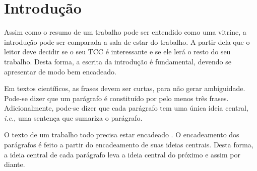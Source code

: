 \documentclass[12pt]{tcc}
\begin{document}

\dcover

\dcoverback
	
		




\dtables
	

\justifying
	
\chapter{Introdução}
\label{sec:introducao}

Assim como o resumo de um trabalho pode ser entendido como uma vitrine, a introdução pode ser comparada a sala de estar do trabalho. A partir dela que o leitor deve decidir se o seu \acrfull{TCC} é interessante e se ele lerá o resto do seu trabalho. Desta forma, a escrita da introdução é fundamental, devendo se apresentar de modo bem encadeado. 

Em textos científicos, as frases devem ser curtas, para não gerar ambiguidade. Pode-se dizer que um parágrafo é constituído por pelo menos três frases. Adicionalmente, pode-se dizer que cada parágrafo tem uma única ideia central, \emph{i.e.}, uma sentença  que sumariza o parágrafo. 

O texto de um trabalho todo precisa estar encadeado \citep{zobel_writing_2015}. O encadeamento dos parágrafos é feito a partir do encadeamento de suas ideias centrais. Desta forma, a ideia central de cada parágrafo leva a ideia central do próximo e assim por diante. 
\end{document}
